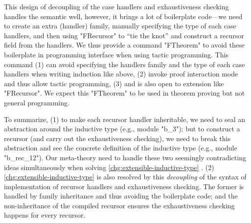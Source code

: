 
This design of decoupling of the case handlers and exhaustiveness checking handles the semantic well, however, it brings a lot of boilerplate code---we need to create an extra (handler) family, manually specifying the type of each case handlers, and then using "FRecursor" to ``tie the knot'' and construct a recursor field from the handlers.  
We thus provide a command "FTheorem" to avoid these boilerplate in programming interface when using tactic programming. 
This command (1) can avoid specifying the handlers family and the type of each case handlers when writing induction like above, (2) invoke
proof interaction mode and thus allow tactic programming, (3) and is also open to extension like "FRecursor". We expect this "FTheorem" to be used in theorem proving but not general programming. 

To summarize, (1) to make each recursor
handler inheritable, we need to seal an abstraction around the inductive
type (e.g., module "b_3"); but to construct a recursor (and carry out the
exhaustiveness checking), we need to break this abstraction and see the
concrete definition of the inductive type (e.g., module "b_rec_12"). Our
meta-theory need to handle these two seemingly contradicting ideas
simultaneously when solving \ref{chg:extensible-inductive-type} . (2) \ref{chg:extensible-inductive-type} is also resolved by this \textit{decoupling} of the syntax of implementation of recursor handlers and exhaustiveness checking. The former is handled by family inheritance and thus avoiding the boilerplate code; and the non-inheritance of the compiled recursor ensures the exhaustiveness checking happens for every recursor.  



